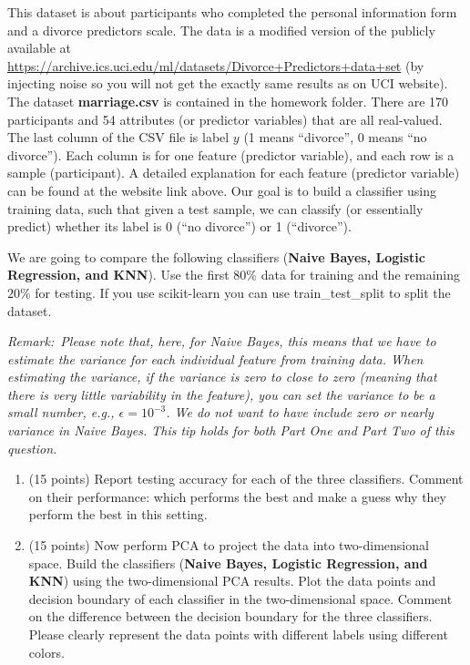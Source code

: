 \documentclass[twoside,10pt]{article}
\begin{document}
This dataset is about participants who completed the personal information form and a divorce predictors scale.  The data is a modified version of the publicly available at  \url{https://archive.ics.uci.edu/ml/datasets/Divorce+Predictors+data+set} (by injecting noise so you will not get the exactly same results as on UCI website).  The dataset \textbf{marriage.csv} is contained in the homework folder. There are 170 participants and 54 attributes (or predictor variables) that are all real-valued. The last column of the CSV file is label $y$ (1 means ``divorce'', 0 means ``no divorce''). Each column is for one feature (predictor variable), and each row is a sample (participant). A detailed explanation for each feature (predictor variable) can be found at the website link above. Our goal is to build a classifier using training data, such that given a test sample, we can classify (or essentially predict) whether its label is 0 (``no divorce'') or 1 (``divorce''). 

We are going to compare the following classifiers  ({\bf Naive Bayes, Logistic Regression, and KNN}). Use the first $80\%$ data for training and the remaining $20\%$ for testing. If you use \textsf{scikit-learn} you can use \textsf{train\_test\_split} to split the dataset. 

\textit{Remark: Please note that, here, for Naive Bayes, this means that we have to estimate the variance for each individual feature from training data. When estimating the variance, if the variance is zero to close to zero (meaning that there is very little variability in the feature), you can set the variance to be a small number, e.g., $\epsilon = 10^{-3}$. We do not want to have include zero or nearly variance in Naive Bayes. This tip holds for both Part One and Part Two of this question.}


\begin{enumerate}

	\item (15 points) Report testing accuracy for each of the three classifiers.  Comment on their performance: which performs the best and make a guess why they perform the best in this setting. 
	\item (15 points) Now perform PCA to project the data into two-dimensional space. Build the classifiers  ({\bf Naive Bayes, Logistic Regression, and KNN}) using the two-dimensional PCA results. Plot the data points and decision boundary of each classifier in the two-dimensional space. Comment on the difference between the decision boundary for the three classifiers. Please clearly represent the data points with different labels using different colors.
	
\end{enumerate}
\end{document}
